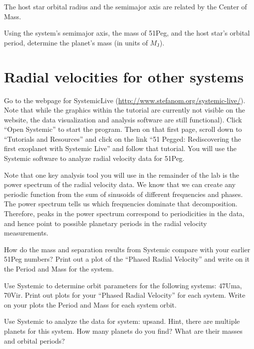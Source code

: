 The host star orbital radius and the semimajor axis are related by the Center of Mass.

\begin{steps}
	\item Using the system's semimajor axis, the mass of 51Peg, and the host star’s orbital period, determine the planet’s mass (in units of $M_\textrm{J}$).
\end{steps}

\section{Radial velocities for other systems}

Go to the webpage for SystemicLive (\url{http://www.stefanom.org/systemic-live/}). Note that while the graphics within the tutorial are currently not visible on the website, the data visualization and analysis software are still functional). Click ``Open Systemic'' to start the program. Then on that first page, scroll down to ``Tutorials and Resources'' and click on the link ``51 Pegged: Rediscovering the first exoplanet with Systemic Live'' and follow that tutorial. You will use the Systemic software to analyze radial velocity data for 51Peg.

Note that one key analysis tool you will use in the remainder of the lab is the power spectrum of the radial velocity data. We know that we can create any periodic function from the sum of sinusoids of different frequencies and phases. The power spectrum tells us which frequencies dominate that decomposition. Therefore, peaks in the power spectrum correspond to periodicities in the data, and hence point to possible planetary periods in the radial velocity measurements.

\begin{steps}
	\item How do the mass and separation results from Systemic compare with your earlier 51Peg numbers? Print out a plot of the ``Phased Radial Velocity'' and write on it the Period and Mass for the system.
	
	\item Use Systemic to determine orbit parameters for the following systems: 47Uma, 70Vir. Print out plots for your ``Phased Radial Velocity'' for each system. Write on your plots the Period and Mass for each system orbit.
	
	\item Use Systemic to analyze the data for system: upsand. Hint, there are multiple planets for this system. How many planets do you find? What are their masses and orbital periods?
	
\end{steps}

